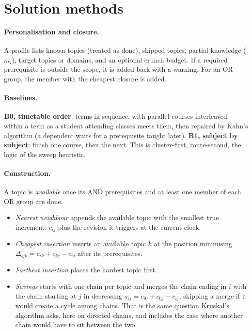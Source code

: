\documentclass[11pt,a4paper]{article}
\begin{document}
\section{Solution methods}
\label{sec:methods}
\paragraph{Personalisation and closure.} A profile lists known topics (treated as done), skipped topics, partial knowledge ($m_i$), target topics or domains, and an optional crunch budget. If a required prerequisite is outside the scope, it is added back with a warning. For an OR group, the member with the cheapest closure is added.

\paragraph{Baselines.} \textbf{B0, timetable order}: terms in sequence, with parallel courses interleaved within a term as a student attending classes meets them, then repaired by Kahn's algorithm (a dependent waits for a prerequisite taught later). \textbf{B1, subject by subject}: finish one course, then the next. This is cluster-first, route-second, the logic of the sweep heuristic.

\paragraph{Construction.} A topic is \emph{available} once its AND prerequisites and at least one member of each OR group are done.
\begin{itemize}
\item \emph{Nearest neighbour} appends the available topic with the smallest true increment: $c_{ij}$ plus the revision it triggers at the current clock.
\item \emph{Cheapest insertion} inserts an available topic $k$ at the position minimising $\Delta_{ijk}=c_{ik}+c_{kj}-c_{ij}$ after its prerequisites.
\item \emph{Farthest insertion} places the hardest topic first.
\item \emph{Savings} starts with one chain per topic and merges the chain ending in $i$ with the chain starting at $j$ in decreasing $s_{ij}=c_{i0}+c_{0j}-c_{ij}$, skipping a merge if it would create a cycle among chains. That is the same question Kruskal's algorithm asks, here on directed chains, and includes the case where another chain would have to sit between the two.
\end{itemize}
\end{document}
